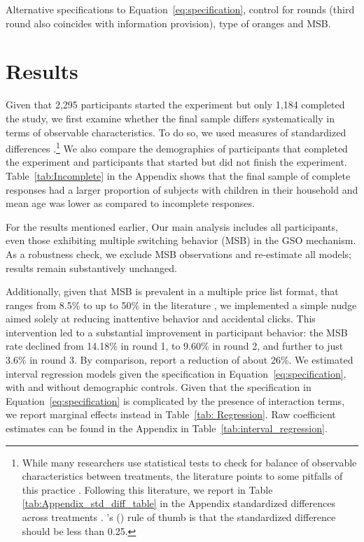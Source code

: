 \documentclass[12pt]{article}
\newcommand\citeapos[1]{\citeauthor{#1}'s (\citeyear{#1})} %
\begin{document}
Alternative specifications to Equation~\ref{eq:specification}, control for rounds (third round also coincides with information provision), type of oranges and MSB.

\section{Results}
\label{Results}


Given that 2,295 participants started the experiment but only 1,184 completed the study, we first examine whether the final sample differs systematically in terms of observable characteristics. To do so, we used measures of standardized differences \citep{CochranRubin1973}.\footnote{While many researchers use statistical tests to check for balance of observable characteristics between treatments, the literature points to some pitfalls of this practice \citep[e.g.,][]{canavari2019run,DeatonCartwright2016,BrizEtAl2017,HoEtAl2007,MoherEtAl2010,MutzPemantle2015}. Following this literature, we report in Table \ref{tab:Appendix_std_diff_table} in the Appendix standardized differences across treatments \citep{ImbensRubin2016,ImbensWooldridge2009}. \citeapos{CochranRubin1973} rule of thumb is that the standardized difference should be less than 0.25.}  We also compare the demographics of participants that completed the experiment and participants that started but did not finish the experiment. Table~\ref{tab:Incomplete} in the Appendix shows that the final sample of complete responses had a larger proportion of subjects with children in their household and mean age was lower as compared to incomplete responses.

For the results mentioned earlier, Our main analysis includes all participants, even those exhibiting multiple switching behavior (MSB) in the GSO mechanism. As a robustness check, we exclude MSB observations and re-estimate all models; results remain substantively unchanged.

Additionally, given that MSB is prevalent in a multiple price list format, that ranges from 8.5\%  to up to 50\% in the literature \citep{yu2021multiple, filippin2016reconsideration}, we implemented a simple nudge aimed solely at reducing inattentive behavior and accidental clicks. This intervention led to a substantial improvement in participant behavior: the MSB rate declined from 14.18\% in round 1, to 9.60\% in round 2, and further to just 3.6\% in round 3. By comparison, \citet{yu2021multiple} report a reduction of about 26\%.
We estimated interval regression models given the specification in Equation~\ref{eq:specification}, with and without demographic controls. Given that the specification in Equation~\ref{eq:specification} is complicated by the presence of interaction terms, we report marginal effects instead in Table~\ref{tab: Regression}. Raw coefficient estimates can be found in the Appendix in Table~\ref{tab:interval_regression}.
\end{document}

